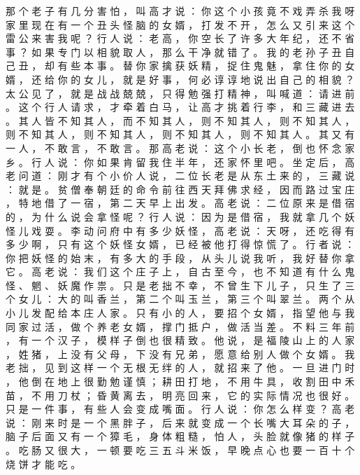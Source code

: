 {那 个 老 子 有 几 分 害 怕 ， 叫 高 才 说 ： 你 这 个 小 孩 竟 不 戏 弄 杀 我 呀 家 里 现 在 有 一 个 丑 头 怪 脑 的 女 婿 ， 打 发 不 开 ， 怎 么 又 引 来 这 个 雷 公 来 害 我 呢 ？ 行 人 说 ： 老 高 ， 你 空 长 了 许 多 大 年 纪 ， 还 不 省 事 ？
如 果 专 门 以 相 貌 取 人 ， 那 么 干 净 就 错 了 。
我 的 老 孙 子 丑 自 己 丑 ， 却 有 些 本 事 。
替 你 家 擒 获 妖 精 ， 捉 住 鬼 魅 ， 拿 住 你 的 女 婿 ， 还 给 你 的 女 儿 ， 就 是 好 事 ， 何 必 谆 谆 地 说 出 自 己 的 相 貌 ？ 太 公 见 了 ， 就 是 战 战 兢 兢 ， 只 得 勉 强 打 精 神 ， 叫 喊 道 ： 请 进 前 。
这 个 行 人 请 求 ， 才 牵 着 白 马 ， 让 高 才 挑 着 行 李 ， 和 三 藏 进 去 。
其 人 皆 不 知 其 人 ， 而 不 知 其 人 ， 则 不 知 其 人 ， 则 不 知 其 人 ， 则 不 知 其 人 ， 则 不 知 其 人 ， 则 不 知 其 人 ， 则 不 知 其 人 。
其 又 有 一 人 ， 不 敢 言 ， 不 敢 言 。
那 高 老 说 ： 这 个 小 长 老 ， 倒 也 怀 念 家 乡 。
行 人 说 ： 你 如 果 肯 留 我 住 半 年 ， 还 家 怀 里 吧 。
坐 定 后 ， 高 老 问 道 ： 刚 才 有 个 小 价 人 说 ， 二 位 长 老 是 从 东 土 来 的 ， 三 藏 说 ： 就 是 。
贫 僧 奉 朝 廷 的 命 令 前 往 西 天 拜 佛 求 经 ， 因 而 路 过 宝 庄 ， 特 地 借 了 一 宿 ， 第 二 天 早 上 出 发 。
高 老 说 ： 二 位 原 来 是 借 宿 的 ， 为 什 么 说 会 拿 怪 呢 ？ 行 人 说 ： 因 为 是 借 宿 ， 我 就 拿 几 个 妖 怪 儿 戏 耍 。
李 动 问 府 中 有 多 少 妖 怪 ， 高 老 说 ： 天 呀 ， 还 吃 得 有 多 少 啊 ， 只 有 这 个 妖 怪 女 婿 ， 已 经 被 他 打 得 惊 慌 了 。
行 者 说 ： 你 把 妖 怪 的 始 末 ， 有 多 大 的 手 段 ， 从 头 儿 说 我 听 ， 我 好 替 你 拿 它 。
高 老 说 ： 我 们 这 个 庄 子 上 ， 自 古 至 今 ， 也 不 知 道 有 什 么 鬼 怪 、 魍 、 妖 魔 作 祟 。
只 是 老 拙 不 幸 ， 不 曾 生 下 儿 子 ， 只 生 了 三 个 女 儿 ： 大 的 叫 香 兰 ， 第 二 个 叫 玉 兰 ， 第 三 个 叫 翠 兰 。
两 个 从 小 儿 发 配 给 本 庄 人 家 。
只 有 小 的 人 ， 要 招 个 女 婿 ， 指 望 他 与 我 同 家 过 活 ， 做 个 养 老 女 婿 ， 撑 门 抵 户 ， 做 活 当 差 。
不 料 三 年 前 ， 有 一 个 汉 子 ， 模 样 子 倒 也 很 精 致 。
他 说 ， 是 福 陵 山 上 的 人 家 ， 姓 猪 ， 上 没 有 父 母 ， 下 没 有 兄 弟 ， 愿 意 给 别 人 做 个 女 婿 。
我 老 拙 ， 见 到 这 样 一 个 无 根 无 绊 的 人 ， 就 招 来 了 他 。
一 旦 进 门 时 ， 他 倒 在 地 上 很 勤 勉 谨 慎 ； 耕 田 打 地 ， 不 用 牛 具 ， 收 割 田 中 禾 苗 ， 不 用 刀 杖 ； 昏 黄 离 去 ， 明 亮 回 来 ， 它 的 实 际 情 况 也 很 好 。
只 是 一 件 事 ， 有 些 人 会 变 成 嘴 面 。
行 人 说 ： 你 怎 么 样 变 ？ 高 老 说 ： 刚 来 时 是 一 个 黑 胖 子 ， 后 来 就 变 成 一 个 长 嘴 大 耳 朵 的 子 ， 脑 子 后 面 又 有 一 个 獐 毛 ， 身 体 粗 糙 ， 怕 人 ， 头 脸 就 像 猪 的 样 子 。
吃 肠 又 很 大 ， 一 顿 要 吃 三 五 斗 米 饭 ， 早 晚 点 心 也 要 一 百 十 个 烧 饼 才 能 吃 。
}
